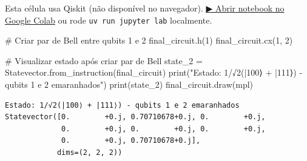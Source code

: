 \documentclass[
  brazilian,
]{report}
\newenvironment{Shaded}{\begin{snugshade}}{\end{snugshade}}
\newcommand{\BuiltInTok}[1]{\textcolor[rgb]{0.00,0.23,0.31}{#1}}
\newcommand{\CommentTok}[1]{\textcolor[rgb]{0.37,0.37,0.37}{#1}}
\newcommand{\DecValTok}[1]{\textcolor[rgb]{0.68,0.00,0.00}{#1}}
\newcommand{\NormalTok}[1]{\textcolor[rgb]{0.00,0.23,0.31}{#1}}
\newcommand{\OperatorTok}[1]{\textcolor[rgb]{0.37,0.37,0.37}{#1}}
\newcommand{\StringTok}[1]{\textcolor[rgb]{0.13,0.47,0.30}{#1}}
\begin{document}
\begin{tcolorbox}[enhanced jigsaw, arc=.35mm, bottomrule=.15mm, bottomtitle=1mm, breakable, colback=white, colbacktitle=quarto-callout-warning-color!10!white, colframe=quarto-callout-warning-color-frame, coltitle=black, left=2mm, leftrule=.75mm, opacityback=0, opacitybacktitle=0.6, rightrule=.15mm, title=\textcolor{quarto-callout-warning-color}{\faExclamationTriangle}\hspace{0.5em}{⚛️ Célula Qiskit --- execute no Colab ou localmente}, titlerule=0mm, toprule=.15mm, toptitle=1mm]

Esta célula usa Qiskit (não disponível no navegador).
\href{https://colab.research.google.com/github/maxwellamaral/aula-quantum/blob/main/notebooks/02-teletransport.ipynb}{▶
Abrir notebook no Google Colab} ou rode \texttt{uv\ run\ jupyter\ lab}
localmente.

\begin{Shaded}
\begin{Highlighting}[]

\CommentTok{\# Criar par de Bell entre qubits 1 e 2}
\NormalTok{final\_circuit.h(}\DecValTok{1}\NormalTok{)}
\NormalTok{final\_circuit.cx(}\DecValTok{1}\NormalTok{, }\DecValTok{2}\NormalTok{)}

\CommentTok{\# Visualizar estado após criar par de Bell}
\NormalTok{state\_2 }\OperatorTok{=}\NormalTok{ Statevector.from\_instruction(final\_circuit)}
\BuiltInTok{print}\NormalTok{(}\StringTok{"Estado: 1/√2(|100⟩ + |111⟩) {-} qubits 1 e 2 emaranhados"}\NormalTok{)}
\BuiltInTok{print}\NormalTok{(state\_2)}
\NormalTok{final\_circuit.draw(}\StringTok{\textquotesingle{}mpl\textquotesingle{}}\NormalTok{)}
\end{Highlighting}
\end{Shaded}

\end{tcolorbox}

\begin{verbatim}
Estado: 1/√2(|100⟩ + |111⟩) - qubits 1 e 2 emaranhados
Statevector([0.        +0.j, 0.70710678+0.j, 0.        +0.j,
             0.        +0.j, 0.        +0.j, 0.        +0.j,
             0.        +0.j, 0.70710678+0.j],
            dims=(2, 2, 2))
\end{verbatim}
\end{document}
